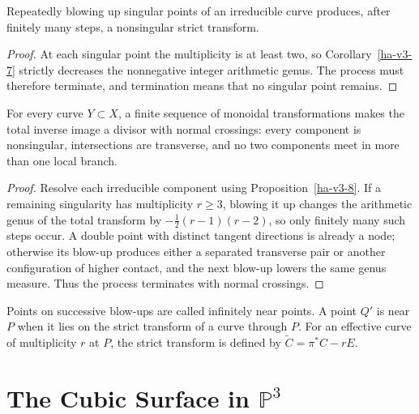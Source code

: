 \begin{proposition}
\label{ha-v3-8}
Repeatedly blowing up singular points of an irreducible curve produces, after
finitely many steps, a nonsingular strict transform.
\end{proposition}
\begin{proof}
At each singular point the multiplicity is at least two, so Corollary~\ref{ha-v3-7}
strictly decreases the nonnegative integer arithmetic genus.  The process must
therefore terminate, and termination means that no singular point remains.
\end{proof}

\begin{theorem}
\label{ha-v3-9}
For every curve \(Y\subset X\), a finite sequence of monoidal transformations
makes the total inverse image a divisor with normal crossings: every component
is nonsingular, intersections are transverse, and no two components meet in more
than one local branch.
\end{theorem}
\begin{proof}
Resolve each irreducible component using Proposition~\ref{ha-v3-8}.  If a
remaining singularity has multiplicity \(r\ge3\), blowing it up changes the
arithmetic genus of the total transform by
\(-\frac12(r-1)(r-2)\), so only finitely many such steps occur.  A double point
with distinct tangent directions is already a node; otherwise its blow-up
produces either a separated transverse pair or another configuration of higher
contact, and the next blow-up lowers the same genus measure.  Thus the process
terminates with normal crossings.
\end{proof}

\begin{definition}
Points on successive blow-ups are called infinitely near points.  A point $Q'$
is near $P$ when it lies on the strict transform of a curve through $P$.
For an effective curve of multiplicity $r$ at $P$, the strict transform is
defined by $\widetilde C=\pi^*C-rE$.
\end{definition}

\section{The Cubic Surface in \(\mathbb P^3\)}
\label{ha-v4}

